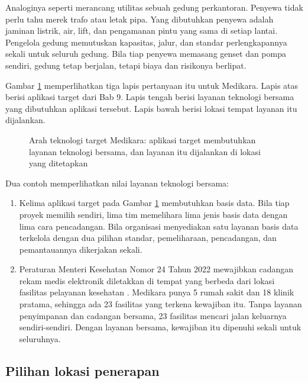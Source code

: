 Analoginya seperti merancang utilitas sebuah gedung perkantoran. Penyewa
tidak perlu tahu merek trafo atau letak pipa. Yang dibutuhkan penyewa adalah
jaminan listrik, air, lift, dan pengamanan pintu yang sama di setiap lantai.
Pengelola gedung memutuskan kapasitas, jalur, dan standar perlengkapannya
sekali untuk seluruh gedung. Bila tiap penyewa memasang genset dan pompa
sendiri, gedung tetap berjalan, tetapi biaya dan risikonya berlipat.

Gambar \ref{fig:ch10-arah-teknologi} memperlihatkan tiga lapis pertanyaan itu
untuk Medikara. Lapis atas berisi aplikasi target dari Bab 9. Lapis tengah
berisi layanan teknologi bersama yang dibutuhkan aplikasi tersebut. Lapis
bawah berisi lokasi tempat layanan itu dijalankan.

\begin{figure}[!htb]
  \centering
  
  \caption{Arah teknologi target Medikara: aplikasi target membutuhkan layanan
           teknologi bersama, dan layanan itu dijalankan di lokasi yang
           ditetapkan}
  \label{fig:ch10-arah-teknologi}
\end{figure}

Dua contoh memperlihatkan nilai layanan teknologi bersama:

\begin{enumerate}
  \item Kelima aplikasi target pada Gambar \ref{fig:ch10-arah-teknologi}
        membutuhkan basis data. Bila tiap proyek memilih sendiri, lima tim
        memelihara lima jenis basis data dengan lima cara pencadangan. Bila
        organisasi menyediakan satu layanan basis data terkelola dengan dua
        pilihan standar, pemeliharaan, pencadangan, dan pemantauannya
        dikerjakan sekali.
  \item Peraturan Menteri Kesehatan Nomor 24 Tahun 2022 mewajibkan cadangan
        rekam medis elektronik diletakkan di tempat yang berbeda dari lokasi
        fasilitas pelayanan kesehatan \cite{permenkes24-2022}. Medikara punya
        5 rumah sakit dan 18 klinik pratama, sehingga ada 23 fasilitas yang
        terkena kewajiban itu. Tanpa layanan penyimpanan dan cadangan
        bersama, 23 fasilitas mencari jalan keluarnya sendiri-sendiri.
        Dengan layanan bersama, kewajiban itu dipenuhi sekali untuk
        seluruhnya.
\end{enumerate}

\subsection*{Pilihan lokasi penerapan}

